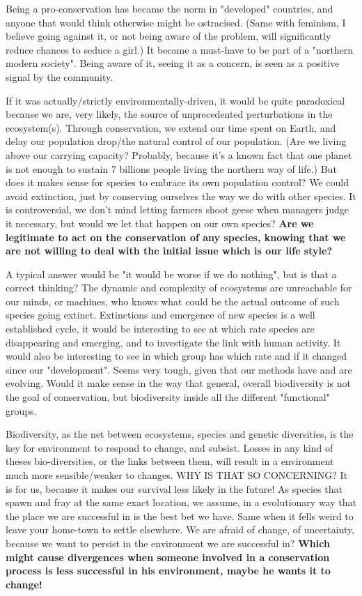 \documentclass[12pt]{article}
\begin{document}
Being a pro-conservation has became the norm in "developed" countries, and anyone that would think otherwise might be ostracised.
(Same with feminism, I believe going against it, or not being aware of the problem, will significantly reduce chances to seduce a girl.)
It became a must-have to be part of a "northern modern society".
Being aware of it, seeing it as a concern, is seen as a positive signal by the community.

If it was actually/strictly environmentally-driven, it would be quite paradoxical because we are, very likely, the source of unprecedented perturbations in the ecosystem(s).
Through conservation, we extend our time spent on Earth, and delay our population drop/the natural control of our population. 
(Are we living above our carrying capacity? Probably, because it's a known fact that one planet is not enough to sustain 7 billions people living the northern way of life.)
But does it makes sense for species to embrace its own population control? We could avoid extinction, just by conserving ourselves the way we do with other species.
It is controversial, we don't mind letting farmers shoot geese when managers judge it necessary, but would we let that happen on our own species?
\textbf{Are we legitimate to act on the conservation of any species, knowing that we are not willing to deal with the initial issue which is our life style?}

A typical answer would be "it would be worse if we do nothing", but is that a correct thinking?
The dynamic and complexity of ecosystems are unreachable for our minds, or machines, who knows what could be the actual outcome of such species going extinct.
Extinctions and emergence of new species is a well established cycle, it would be interesting to see at which rate species are disappearing and emerging, and to investigate the link with human activity.
It would also be interesting to see in which group has which rate and if it changed since our "development".
Seems very tough, given that our methods have and are evolving.
Would it make sense in the way that general, overall biodiversity is not the goal of conservation, but biodiversity inside all the different "functional" groups.

Biodiversity, as the net between ecosystems, species and genetic diversities, is the key for environment to respond to change, and subsist. Losses in any kind of theses bio-diversities, or the links between them, will result in a environment much more sensible/weaker to changes. WHY IS THAT SO CONCERNING? It is for us, because it makes our survival less likely in the future! As species that spawn and fray at the same exact location, we assume, in a evolutionary way that the place we are successful in is the best bet we have. Same when it fells weird to leave your home-town to settle elsewhere. We are afraid of change, of uncertainty, because we want to persist in the environment we are successful in? \textbf{Which might cause divergences when someone involved in a conservation process is less successful in his environment, maybe he wants it to change!}\\
\end{document}
